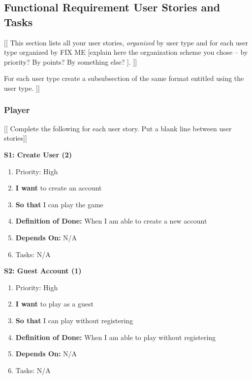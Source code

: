 \subsection{Functional Requirement User Stories and Tasks}

[[
This section lists all your user stories, \emph{organized} by user type and for each user type organized by FIX ME
[explain here the organization scheme you chose -- by priority? By points? By something else? ].
]]

For each user type create a subsubsection of the same format entitled using the
user type. ]]


\subsubsection{Player}

[[ Complete the following for each user story.
Put a blank line between user stories]]

\textbf{S1: Create User (2)}
\begin{enumerate}
    \item Priority: High
    \item \textbf{I want} to create an account
    \item \textbf{So that} I can play the game
    \item \textbf{Definition of Done:} When I am able to create a new account
    \item \textbf{Depends On:} N/A
    \item Tasks: N/A
\end{enumerate}


\textbf{S2: Guest Account (1)}
\begin{enumerate}
    \item Priority: High
    \item \textbf{I want} to play as a guest
    \item \textbf{So that} I can play without registering
    \item \textbf{Definition of Done:} When I am able to play without registering
    \item \textbf{Depends On:} N/A
    \item Tasks: N/A
\end{enumerate}


